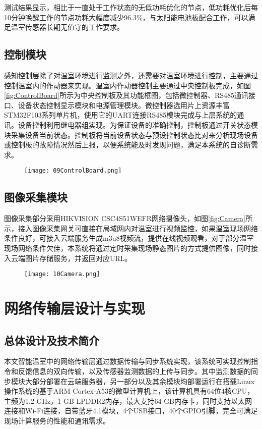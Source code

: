 测试结果显示，相比于一直处于工作状态的无低功耗优化的节点，低功耗优化后每10分钟唤醒工作的节点功耗大幅度减少96.3\%，与太阳能电池板配合工作，可以满足温室传感器长期无值守的工作要求。

	\subsection{控制模块}
	感知控制层除了对温室环境进行监测之外，还需要对温室环境进行控制，主要通过控制温室内的作动器来实现。温室内作动器控制主要通过中央控制板完成，如图\ref{fig:ControlBoard}所示为中央控制板及其功能框图，包括微控制器、RS485通讯接口、设备状态控制显示模块和电源管理模块。微控制器选用片上资源丰富STM32F103系列单片机，使用它的UART连接RS485模块完成与上层系统的通讯。设备控制利用继电器组实现。为保证设备的准确控制，控制板通过开关状态模块采集设备当前状态。控制板将当前设备状态与预设控制状态比对来分析现场设备或控制板的故障情况然后上报，以便系统能及时发现问题，满足本系统的自诊断需求。
	
	\begin{figure}[!htbp]
		\centering
		\texttt{[image: 09ControlBoard.png]}
	\end{figure}
	\subsection{图像采集模块}
图像采集部分采用HIKVISION CSC4S51WEFR网络摄像头，如图\ref{fig:Camera}所示，接入图像采集网关可直接在局域网内对温室进行视频监控，如果温室现场网络条件良好，可接入云端服务生成m3u8视频流，提供在线视频观看，对于部分温室现场网络条件欠佳，本系统将通过定时采集现场静态图片的方式提供图像，同时接入云端图片存储服务，并返回对应URL。

	\begin{figure}[!htbp]
		\centering
		\texttt{[image: 10Camera.png]}
	\end{figure}
\section{网络传输层设计与实现}
	\subsection{总体设计及技术简介}
	本文智能温室中的网络传输层通过数据传输与同步系统实现，该系统可实现控制指令和反馈信息的双向传输，以及传感器监测数据的上传与同步。其中监测数据的同步模块大部分部署在云端服务器，另一部分以及其余模块均部署运行在搭载Linux操作系统的基于ARM Cortex-A53的微型计算机上，该计算机具有64位4核CPU，主频为1.2 GHz，1 GB LPDDR2内存，最大支持64 GB内存卡，同时支持以太网连接和Wi-Fi连接，自带蓝牙4.1模块，4个USB接口，40个GPIO引脚，完全可满足现场计算服务的性能和通讯需求。
	

